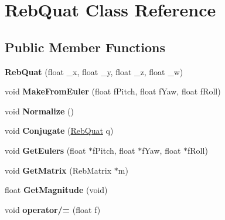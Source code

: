 \hypertarget{class_reb_quat}{}\section{Reb\+Quat Class Reference}
\label{class_reb_quat}
\subsection*{Public Member Functions}
\begin{DoxyCompactItemize}
\item 
{\bfseries Reb\+Quat} (float \+\_\+x, float \+\_\+y, float \+\_\+z, float \+\_\+w)\hypertarget{class_reb_quat_a7c0477e3d9fe926d2ba8f2b1dced809a}{}\label{class_reb_quat_a7c0477e3d9fe926d2ba8f2b1dced809a}

\item 
void {\bfseries Make\+From\+Euler} (float f\+Pitch, float f\+Yaw, float f\+Roll)\hypertarget{class_reb_quat_ab767b26e1d5dc4396fd1a767676df6bd}{}\label{class_reb_quat_ab767b26e1d5dc4396fd1a767676df6bd}

\item 
void {\bfseries Normalize} ()\hypertarget{class_reb_quat_a8ffda166ea2a900eae57c477c680a702}{}\label{class_reb_quat_a8ffda166ea2a900eae57c477c680a702}

\item 
void {\bfseries Conjugate} (\hyperlink{class_reb_quat}{Reb\+Quat} q)\hypertarget{class_reb_quat_a823277a6fa9e9f531209022fbf12c45c}{}\label{class_reb_quat_a823277a6fa9e9f531209022fbf12c45c}

\item 
void {\bfseries Get\+Eulers} (float $\ast$f\+Pitch, float $\ast$f\+Yaw, float $\ast$f\+Roll)\hypertarget{class_reb_quat_a5689b247a2a063ea1f3248cb32cb1012}{}\label{class_reb_quat_a5689b247a2a063ea1f3248cb32cb1012}

\item 
void {\bfseries Get\+Matrix} (Reb\+Matrix $\ast$m)\hypertarget{class_reb_quat_ab8aded8e2ba568a3c4855052d71791d1}{}\label{class_reb_quat_ab8aded8e2ba568a3c4855052d71791d1}

\item 
float {\bfseries Get\+Magnitude} (void)\hypertarget{class_reb_quat_a531f6bde31990ef322053424ae2cf969}{}\label{class_reb_quat_a531f6bde31990ef322053424ae2cf969}

\item 
void {\bfseries operator/=} (float f)\hypertarget{class_reb_quat_a6e9364dd4d43a876c5558d0187ef726c}{}\label{class_reb_quat_a6e9364dd4d43a876c5558d0187ef726c}


\end{DoxyCompactItemize}
